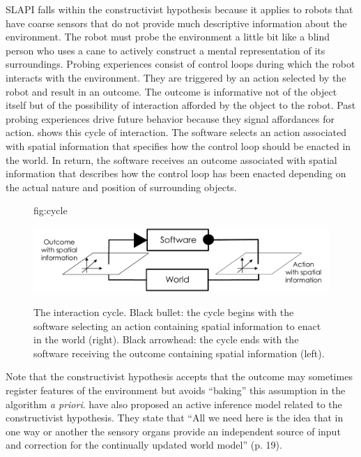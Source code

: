 \documentclass[pmlr]{jmlr}%
\begin{document}
SLAPI falls within the constructivist hypothesis because it applies to robots that have coarse sensors that do not provide much descriptive information about the environment. 
The robot must probe the environment a little bit like a blind person who uses a cane to actively construct a mental representation of its surroundings. 
Probing experiences consist of control loops during which the robot interacts with the environment.   
They are triggered by an action selected by the robot and result in an outcome. 
The outcome is informative not of the object itself but of the possibility of interaction afforded by the object to the robot. 
Past probing experiences drive future behavior because they signal affordances for action. 
 shows this cycle of interaction. 
The software selects an action associated with spatial information that specifies how the control loop should be enacted in the world. 
In return, the software receives an outcome associated with spatial information that describes how the control loop has been enacted depending on the actual nature and position of surrounding objects. 


\begin{figure}[htbp]
	\floatconts
	{fig:cycle}
	{\caption{The interaction cycle. Black bullet: the cycle begins with the software selecting an action containing spatial information to enact in the world (right). Black arrowhead: the cycle ends with the software receiving the outcome containing spatial information (left).}}
	{\includegraphics[width=0.8\linewidth]{images/Figure_0_Cycle}}
\end{figure}

Note that the constructivist hypothesis accepts that the outcome may sometimes register features of the environment but avoids ``baking'' this assumption in the algorithm \textit{a priori}. 
\cite{rudrauf_mathematical_2017} have also proposed an active inference model related to the constructivist hypothesis. They state that ``All we need here is the idea that in one way or another the sensory organs provide an independent source of input and correction for the continually updated world model'' (p. 19).
\end{document}
